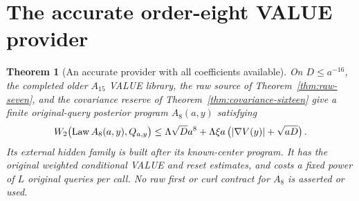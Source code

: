\documentclass[11pt]{article}
\numberwithin{equation}{section}
\newtheorem{theorem}{Theorem}[section]
\theoremstyle{remark}\newtheorem{remark}[theorem]{Remark}
\newcommand{\Law}{\operatorname{Law}}\newcommand{\Lip}{\operatorname{Lip}}
\begin{document}
\section{The accurate order-eight VALUE provider}
\label{sec:accurate-eight}
\begin{theorem}[An accurate provider with all coefficients available]
\label{thm:accurate-eight}
On $D\le a^{-16}$, the completed older $A_{15}$ VALUE library,
the raw source of Theorem~\ref{thm:raw-seven}, and the covariance
reserve of Theorem~\ref{thm:covariance-sixteen} give a finite
original-query posterior program $A_8(a,y)$ satisfying
\[
 W_2\bigl(\Law A_8(a,y),Q_{a,y}\bigr)
 \le\LL\sqrt D a^8
       +\LL\xi a\,\bigl(|\nabla V(y)|+\sqrt{aD}\bigr)\,.
\]
Its external hidden family is built after its known-center program.
It has the original weighted conditional VALUE and reset estimates,
and costs a fixed power of $L$ original queries per call. No raw
first or curl contract for $A_8$ is asserted or used.
\end{theorem}
\end{document}
